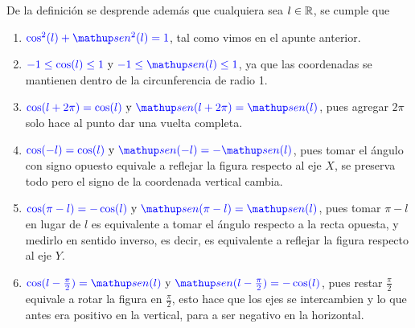 De la definici\'on se desprende adem\'as que cualquiera sea $l\in\mathbb{R}$, se cumple que 
\begin{enumerate}
	\item $\color{blue}{\cos^2(l) + \sen^2(l) = 1}$, tal como vimos en el apunte anterior.
	\item $\color{blue}{ -1 \le \cos(l) \le 1}\color{black}\textup{ y }\color{blue}{ -1 \le \sen (l) \le 1}$, ya que las coordenadas se mantienen dentro de la circunferencia de radio 1.
	\item $\color{blue}{ \cos(l + 2\pi) = \cos(l)}\color{black}\textup{ y }\color{blue}{\sen(l + 2\pi) = \sen(l)}$, pues agregar $2\pi$ solo hace al punto dar una vuelta completa. 

\newpage
	\item $\color{blue}{ \cos(-l) = \cos(l)}\color{black}\textup{ y }\color{blue}{\sen(-l) = -\sen(l)}$, pues tomar el ángulo con signo opuesto equivale a reflejar la figura respecto al eje $X$, se preserva todo pero el signo de la coordenada vertical cambia.
	\item $\color{blue}{ \cos(\pi-l) = -\cos(l)}\color{black}\textup{ y }\color{blue}{\sen(\pi-l) = \sen(l)}$, pues tomar $\pi-l$ en lugar de $l$ es equivalente a tomar el ángulo respecto a la recta opuesta, y medirlo en sentido inverso, es decir, es equivalente a reflejar la figura respecto al eje $Y$.
	\item $\color{blue}{ \cos(l-\frac{\pi}{2}) = \sen(l)}\color{black}\textup{ y }\color{blue}{\sen(l-\frac{\pi}{2}) = -\cos(l)}$, pues restar $\frac{\pi}{2}$ equivale a rotar la figura en $\frac{\pi}{2}$, esto hace que los ejes se intercambien y lo que antes era positivo en la vertical, para a ser negativo en la horizontal.
\end{enumerate}

